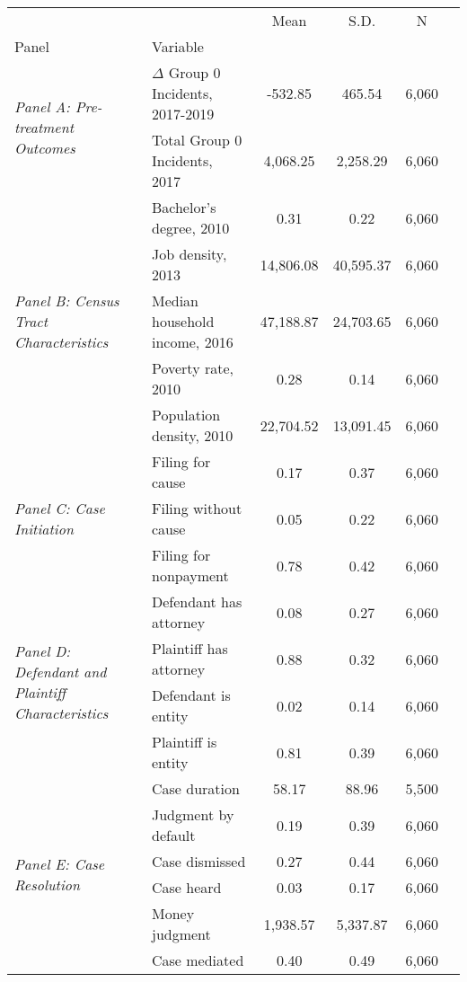 \begin{tabular}{llcccc}
\toprule
 &  & Mean & S.D. & N \\
Panel & Variable &  &  &  \\
\midrule
\multirow[c]{2}{4cm}{\textit{Panel A: Pre-treatment Outcomes}} & $\Delta$ Group 0 Incidents, 2017-2019 & -532.85 & 465.54 & 6,060 \\
 & Total Group 0 Incidents, 2017 & 4,068.25 & 2,258.29 & 6,060 \\
\cline{1-5}
\multirow[c]{5}{4cm}{\textit{Panel B: Census Tract Characteristics}} & Bachelor's degree, 2010 & 0.31 & 0.22 & 6,060 \\
 & Job density, 2013 & 14,806.08 & 40,595.37 & 6,060 \\
 & Median household income, 2016 & 47,188.87 & 24,703.65 & 6,060 \\
 & Poverty rate, 2010 & 0.28 & 0.14 & 6,060 \\
 & Population density, 2010 & 22,704.52 & 13,091.45 & 6,060 \\
\cline{1-5}
\multirow[c]{3}{4cm}{\textit{Panel C: Case Initiation}} & Filing for cause & 0.17 & 0.37 & 6,060 \\
 & Filing without cause & 0.05 & 0.22 & 6,060 \\
 & Filing for nonpayment & 0.78 & 0.42 & 6,060 \\
\cline{1-5}
\multirow[c]{4}{4cm}{\textit{Panel D: Defendant and Plaintiff Characteristics}} & Defendant has attorney & 0.08 & 0.27 & 6,060 \\
 & Plaintiff has attorney & 0.88 & 0.32 & 6,060 \\
 & Defendant is entity & 0.02 & 0.14 & 6,060 \\
 & Plaintiff is entity & 0.81 & 0.39 & 6,060 \\
\cline{1-5}
\multirow[c]{6}{4cm}{\textit{Panel E: Case Resolution}} & Case duration & 58.17 & 88.96 & 5,500 \\
 & Judgment by default & 0.19 & 0.39 & 6,060 \\
 & Case dismissed & 0.27 & 0.44 & 6,060 \\
 & Case heard & 0.03 & 0.17 & 6,060 \\
 & Money judgment & 1,938.57 & 5,337.87 & 6,060 \\
 & Case mediated & 0.40 & 0.49 & 6,060 \\
\cline{1-5}
\bottomrule
\end{tabular}
